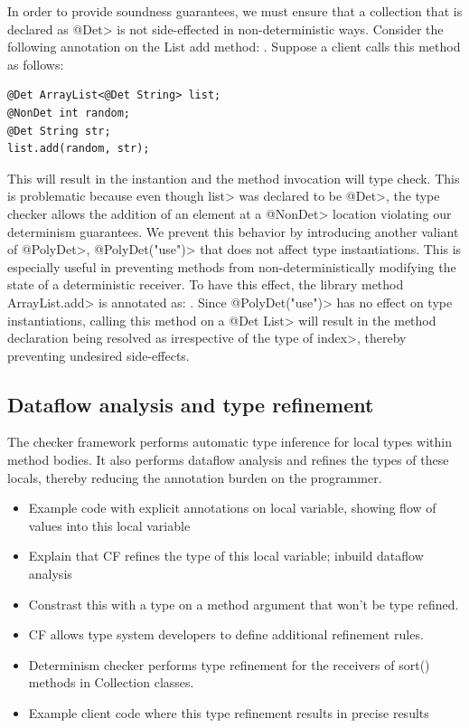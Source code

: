 In order to provide soundness guarantees, we must ensure that a collection that is
declared as \<@Det> is not side-effected in non-deterministic ways. Consider the following annotation 
on the List add method: .
Suppose a client calls this method as follows:
\begin{verbatim}
@Det ArrayList<@Det String> list;
@NonDet int random;
@Det String str;
list.add(random, str);
\end{verbatim}
This will result in the instantion  and
the method invocation will type check. This is problematic because even though \<list> was declared to be \<@Det>,
the type checker allows the addition of an element at a \<@NonDet> location violating our determinism guarantees.
We prevent this behavior by introducing another valiant of \<@PolyDet>, \<@PolyDet("use")> that does not affect
type instantiations. This is especially useful in preventing methods from non-deterministically modifying the state
of a deterministic receiver. To have this effect, the library method \<ArrayList.add> is annotated as:
.
Since \<@PolyDet("use")> has no effect on type instantiations, calling this method on a \<@Det List>
will result in the method declaration being resolved as 
irrespective of the type of \<index>, thereby preventing undesired side-effects.

\subsection{Dataflow analysis and type refinement}
The checker framework performs automatic type inference for local types within method bodies.
It also performs dataflow analysis and refines the types of these locals, thereby reducing the annotation burden 
on the programmer.

\begin{itemize}
	\item Example code with explicit annotations on local variable, showing flow of values into this local variable
	\item Explain that CF refines the type of this local variable; inbuild dataflow analysis
	\item Constrast this with a type on a method argument that won't be type refined.
	\item CF allows type system developers to define additional refinement rules.
	\item Determinism checker performs type refinement for the receivers of sort() methods in Collection classes.
	\item Example client code where this type refinement results in precise results
\end{itemize}

